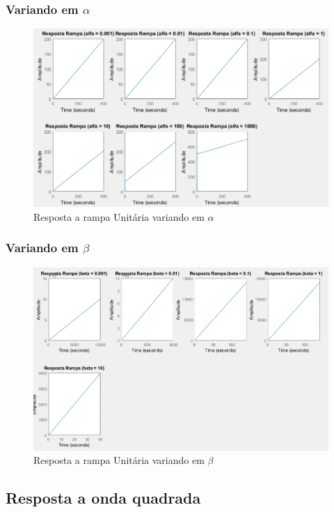 \documentclass[a4paper, 12pt]{article}
\begin{document}
		\subsubsection{Variando em $\alpha$}
		\begin{figure}[!ht]
			\centering
			\includegraphics[scale=0.5]{img/3e_alfa.png}
			\caption{Resposta a rampa Unitária variando em $\alpha$}	
		\end{figure}				
		\subsubsection{Variando em $\beta$}
		\begin{figure}[!ht]
			\centering
			\includegraphics[scale=0.45]{img/3e_beta.png}
			\caption{Resposta a rampa Unitária variando em $\beta$}	
		\end{figure}
		\subsection{Resposta a onda quadrada}					
\end{document}
